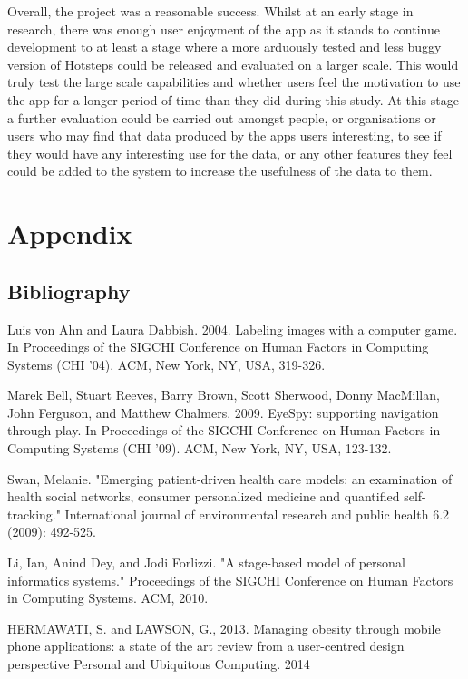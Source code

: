 \documentclass{l4proj}
\begin{document}
Overall, the project was a reasonable success. Whilst at an early stage in research, there was enough user enjoyment of the app as it stands to continue development to at least a stage where a more arduously tested and less buggy version of Hotsteps could be released and evaluated on a larger scale. This would truly test the large scale capabilities and whether users feel the motivation to use the app for a longer period of time than they did during this study. At this stage a further evaluation could be carried out amongst people, or organisations or users who may find that data produced by the apps users interesting, to see if they would have any interesting use for the data, or any other features they feel could be added to the system to increase the usefulness of the data to them.


\chapter{Appendix}

\section{Bibliography}

Luis von Ahn and Laura Dabbish. 2004. Labeling images with a computer game. In Proceedings of the SIGCHI Conference on Human Factors in Computing Systems (CHI '04). ACM, New York, NY, USA, 319-326.

Marek Bell, Stuart Reeves, Barry Brown, Scott Sherwood, Donny MacMillan, John Ferguson, and Matthew Chalmers. 2009. EyeSpy: supporting navigation through play. In Proceedings of the SIGCHI Conference on Human Factors in Computing Systems (CHI '09). ACM, New York, NY, USA, 123-132.

Swan, Melanie. "Emerging patient-driven health care models: an examination of health social networks, consumer personalized medicine and quantified self-tracking." International journal of environmental research and public health 6.2 (2009): 492-525.

Li, Ian, Anind Dey, and Jodi Forlizzi. "A stage-based model of personal informatics systems." Proceedings of the SIGCHI Conference on Human Factors in Computing Systems. ACM, 2010.

HERMAWATI, S. and LAWSON, G., 2013. Managing obesity through mobile phone applications: a state of the art review from a user-centred design perspective Personal and Ubiquitous Computing. 2014
\end{document}
